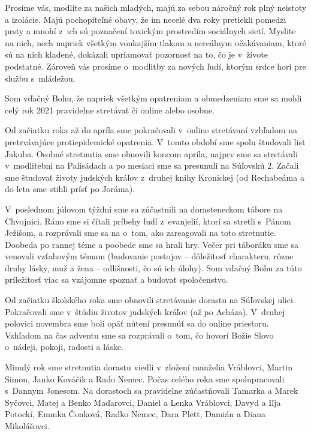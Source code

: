 Prosíme vás, modlite za našich mladých, majú za sebou náročný rok plný neistoty a izolácie. Majú pochopiteľné obavy, že im necelé dva roky pretiekli pomedzi prsty a mnohí z~ich sú poznačení toxickým prostredím sociálnych sietí. Myslite na nich, nech napriek všetkým vonkajším tlakom a nereálnym očakávaniam, ktoré sú na nich kladené, dokázali upriamovať pozornosť na to, čo je v~živote podstatné. Zároveň vás prosíme o~modlitby za nových ľudí, ktorým srdce horí pre službu s~mládežou.



Som vďačný Bohu, že napriek všetkým opatreniam a obmedzeniam sme sa mohli celý rok 2021 pravidelne stretávať či online alebo osobne.

Od začiatku roka až do apríla sme pokračovali v~online stretávaní vzhľadom na pretrvávajúce protiepidemické opatrenia. V~tomto období sme spolu študovali list Jakuba. Osobné stretnutia sme obnovili koncom apríla, najprv sme sa stretávali v~modlitebni na Palisádach a po mesiaci sme sa presunuli na Súľovskú 2. Začali sme študovať životy judských kráľov z~druhej knihy Kronickej (od Rechabeáma a do leta sme stihli prísť po Joráma).

V~poslednom júlovom týždni sme sa zúčastnili na dorasteneckom tábore na Chvojnici. Ráno sme si čítali príbehy ľudí z~evanjelií, ktorí sa stretli s~Pánom Ježišom, a rozprávali sme sa na o~tom, ako zareagovali na toto stretnutie. Doobeda po rannej téme a poobede sme sa hrali hry. Večer pri táboráku sme sa venovali vzťahovým témam (budovanie postojov -- dôležitosť charakteru, rôzne druhy lásky, muž a žena -- odlišnosti, čo sú ich úlohy). Som vďačný Bohu za túto príležitosť viac sa vzájomne spoznať a budovať spoločenstvo.

Od začiatku školského roka sme obnovili stretávanie dorastu na Súľovskej ulici. Pokračovali sme v~štúdiu životov judských kráľov (až po Acháza). V~druhej polovici novembra sme boli opäť nútení presunúť sa do online priestoru. Vzhľadom na čas adventu sme sa rozprávali o~tom, čo hovorí Božie Slovo o~nádeji, pokoji, radosti a láske.

Minulý rok sme stretnutia dorastu viedli v~zložení manželia Vráblovci, Martin Simon, Janko Kováčik a Rado Nemec. Počas celého roka sme spolupracovali s~Dannym Jonesom. Na dorastoch sa pravidelne zúčastňovali Tamarka a Marek Syčovci, Matej a Benko Maďarovci, Daniel a Lenka Vráblovci, Davyd a Iľja Potockí, Emmka Čonková, Radko Nemec, Dara Plett, Damián a Diana Mikolášovci.

